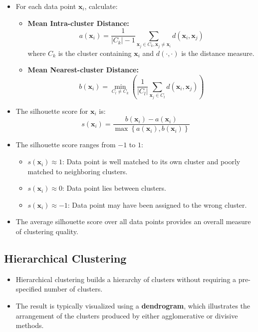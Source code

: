 \documentclass{article}
\begin{document}
\begin{itemize}
    \item For each data point $\boldsymbol{x}_i$, calculate:
    \begin{itemize}
        \item \textbf{Mean Intra-cluster Distance:}
        \[
        a(\boldsymbol{x}_i) = \frac{1}{|C_k| - 1} \sum_{\boldsymbol{x}_j \in C_k, \boldsymbol{x}_j \neq \boldsymbol{x}_i} d(\boldsymbol{x}_i, \boldsymbol{x}_j)
        \]
        where $C_k$ is the cluster containing $\boldsymbol{x}_i$ and $d(\cdot, \cdot)$ is the distance measure.
        \item \textbf{Mean Nearest-cluster Distance:}
        \[
        b(\boldsymbol{x}_i) = \min_{C_l \neq C_k} \left( \frac{1}{|C_l|} \sum_{\boldsymbol{x}_j \in C_l} d(\boldsymbol{x}_i, \boldsymbol{x}_j) \right)
        \]
    \end{itemize}
    \item The silhouette score for $\boldsymbol{x}_i$ is:
    \[
    s(\boldsymbol{x}_i) = \frac{b(\boldsymbol{x}_i) - a(\boldsymbol{x}_i)}{\max \left\{ a(\boldsymbol{x}_i), b(\boldsymbol{x}_i) \right\}}
    \]
    \item The silhouette score ranges from $-1$ to $1$:
    \begin{itemize}
        \item $s(\boldsymbol{x}_i) \approx 1$: Data point is well matched to its own cluster and poorly matched to neighboring clusters.
        \item $s(\boldsymbol{x}_i) \approx 0$: Data point lies between clusters.
        \item $s(\boldsymbol{x}_i) \approx -1$: Data point may have been assigned to the wrong cluster.
    \end{itemize}
    \item The average silhouette score over all data points provides an overall measure of clustering quality.
\end{itemize}

\subsection{Hierarchical Clustering}

\begin{itemize}
    \item Hierarchical clustering builds a hierarchy of clusters without requiring a pre-specified number of clusters.
    \item The result is typically visualized using a \textbf{dendrogram}, which illustrates the arrangement of the clusters produced by either agglomerative or divisive methods.
\end{itemize}
\end{document}

